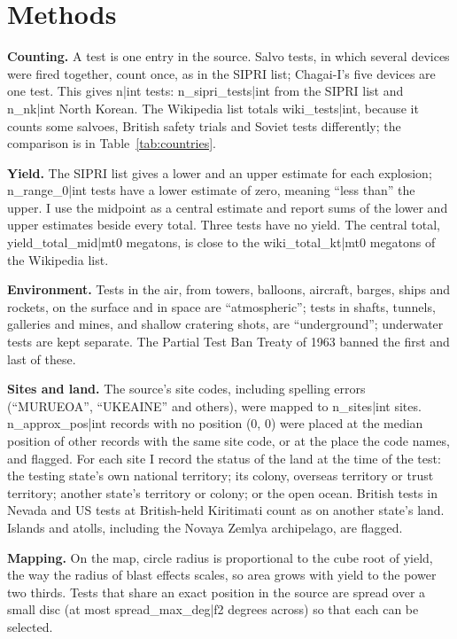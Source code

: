 \documentclass[11pt,a4paper]{article}
\begin{document}
\section{Methods}
\textbf{Counting.} A test is one entry in the source. Salvo tests, in which several devices were fired together, count once, as in the SIPRI list; Chagai-I's five devices are one test. This gives {{n|int}} tests: {{n_sipri_tests|int}} from the SIPRI list and {{n_nk|int}} North Korean. The Wikipedia list totals {{wiki_tests|int}}, because it counts some salvoes, British safety trials and Soviet tests differently; the comparison is in Table~\ref{tab:countries}.

\textbf{Yield.} The SIPRI list gives a lower and an upper estimate for each explosion; {{n_range_0|int}} tests have a lower estimate of zero, meaning ``less than'' the upper. I use the midpoint as a central estimate and report sums of the lower and upper estimates beside every total. Three tests have no yield. The central total, {{yield_total_mid|mt0}} megatons, is close to the {{wiki_total_kt|mt0}} megatons of the Wikipedia list.

\textbf{Environment.} Tests in the air, from towers, balloons, aircraft, barges, ships and rockets, on the surface and in space are ``atmospheric''; tests in shafts, tunnels, galleries and mines, and shallow cratering shots, are ``underground''; underwater tests are kept separate. The Partial Test Ban Treaty of 1963 banned the first and last of these.

\textbf{Sites and land.} The source's site codes, including spelling errors (``MURUEOA'', ``UKEAINE'' and others), were mapped to {{n_sites|int}} sites. {{n_approx_pos|int}} records with no position (0, 0) were placed at the median position of other records with the same site code, or at the place the code names, and flagged. For each site I record the status of the land at the time of the test: the testing state's own national territory; its colony, overseas territory or trust territory; another state's territory or colony; or the open ocean. British tests in Nevada and US tests at British-held Kiritimati count as on another state's land. Islands and atolls, including the Novaya Zemlya archipelago, are flagged.

\textbf{Mapping.} On the map, circle radius is proportional to the cube root of yield, the way the radius of blast effects scales, so area grows with yield to the power two thirds. Tests that share an exact position in the source are spread over a small disc (at most {{spread_max_deg|f2}} degrees across) so that each can be selected.
\end{document}
